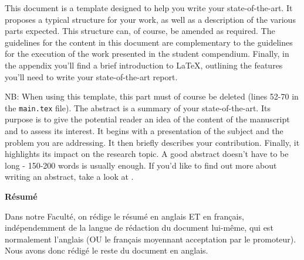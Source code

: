 \documentclass[a4paper]{scrartcl}
\begin{document}
This document is a template designed to help you write your state-of-the-art. It proposes a typical structure for your work, as well as a description of the various parts expected. This structure can, of course, be amended as required.
The guidelines for the content in this document are complementary to the guidelines for the execution of the work presented in the student compendium.
Finally, in the appendix you'll find a brief introduction to \LaTeX, outlining the features you'll need to write your state-of-the-art report.

NB: When using this template, this part must of course be deleted (lines 52-70 in the \texttt{main.tex} file).
\vskip1cm
The abstract is a summary of your state-of-the-art. Its purpose is to give the potential reader an idea of the content of the manuscript and to assess its interest. It begins with a presentation of the subject and the problem you are addressing. It then briefly describes your contribution. Finally, it highlights its impact on the research topic. A good abstract doesn't have to be long - 150-200 words is usually enough. If you'd like to find out more about writing an abstract, take a look at \cite{abstract}.
\vskip1cm
\begin{center}
	\textbf{Résumé}
\end{center}
Dans notre Faculté, on rédige le résumé en anglais ET en français, indépendemment de la langue de rédaction du document lui-même, qui est normalement l'anglais (OU le français moyennant acceptation par le promoteur). Nous avons donc rédigé le reste du document en anglais.


\newpage

\tableofcontents

\newpage




\appendix


\end{document}
